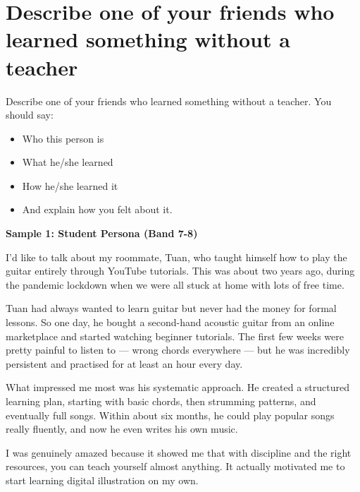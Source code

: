 \newpage

\section{Describe one of your friends who learned something without a teacher}
\begin{ieltsprompt}
Describe one of your friends who learned something without a teacher.
You should say:
\begin{itemize}[leftmargin=2em, itemsep=2pt]
\item Who this person is
\item What he/she learned
\item How he/she learned it
\item And explain how you felt about it.
\end{itemize}
\end{ieltsprompt}
\begin{ieltsanswer}
\textbf{Sample 1: Student Persona (Band 7-8)}

I'd like to talk about my roommate, Tuan, who taught himself how to play the guitar entirely through YouTube tutorials. This was about two years ago, during the pandemic lockdown when we were all stuck at home with lots of free time.

Tuan had always wanted to learn guitar but never had the money for formal lessons. So one day, he bought a second-hand acoustic guitar from an online marketplace and started watching beginner tutorials. The first few weeks were pretty painful to listen to — wrong chords everywhere — but he was incredibly persistent and practised for at least an hour every day.

What impressed me most was his systematic approach. He created a structured learning plan, starting with basic chords, then strumming patterns, and eventually full songs. Within about six months, he could play popular songs really fluently, and now he even writes his own music.

I was genuinely amazed because it showed me that with discipline and the right resources, you can teach yourself almost anything. It actually motivated me to start learning digital illustration on my own.
\end{ieltsanswer}


